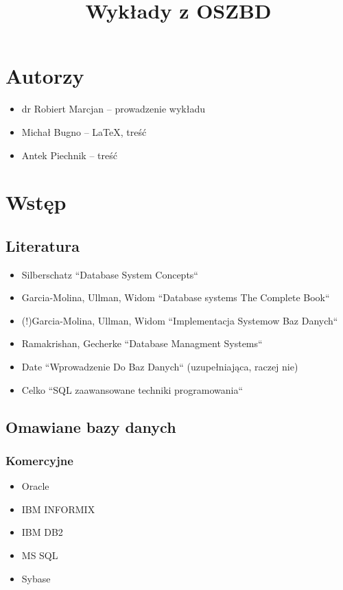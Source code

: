 \documentclass[12pt]{article}
\title{Wykłady z OSZBD}
\begin{document}
\maketitle
\newpage
\tableofcontents
\newpage

\section{Autorzy}
\begin{itemize}
\item dr Robiert Marcjan -- prowadzenie wykładu
\item Michał Bugno -- \LaTeX, treść
\item Antek Piechnik -- treść
\end{itemize}

\section{Wstęp}
\subsection{Literatura}
\begin{itemize}
\item Silberschatz ``Database System Concepts``
\item Garcia-Molina, Ullman, Widom ``Database systems The Complete Book``
\item (!)Garcia-Molina, Ullman, Widom ``Implementacja Systemow Baz Danych``
\item Ramakrishan, Gecherke ``Database Managment Systems``
\item Date ``Wprowadzenie Do Baz Danych`` (uzupełniająca, raczej nie)
\item Celko ``SQL zaawansowane techniki programowania``
\end{itemize}

\subsection{Omawiane bazy danych}
\subsubsection{Komercyjne}
\begin{itemize}
\item Oracle
\item IBM INFORMIX
\item IBM DB2
\item MS SQL
\item Sybase
\end{itemize}
\end{document}

